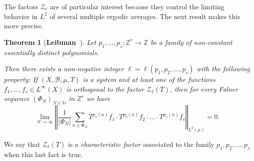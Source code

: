 \documentclass[11pt]{amsart}
\newcommand{\cB}{\mathcal{B}}
\newcommand{\cZ}{\mathcal{Z}}
\newcommand{\N}{\mathbb{N}}
\newcommand{\Z}{\mathbb{Z}}
\newcommand{\norm}[1]{\left\Vert #1\right\Vert}
\theoremstyle{plain}
\newtheorem{theorem}{Theorem}[section]
\theoremstyle{definition}
\theoremstyle{remark}
\begin{document}
The factors $\cZ_\ell$ are of particular interest because they control
the limiting behavior in $L^2$ of several multiple
ergodic averages. The next result makes this more precise.
\begin{theorem}[{\bf Leibman~\cite{L3}}]\label{T:L2}
  Let $p_1,\ldots,p_s\colon \Z^r\to \Z$ be a family of non-constant essentially
  distinct polynomials.

Then   there exists a non-negative integer $\ell=\ell(p_1,p_2,\ldots,p_s)$
  with the following property: If $(X,\cB,\mu,T)$ is a system and at least
  one of the functions
  $f_1,\ldots,f_s\in L^\infty(X)$ is orthogonal to the factor $\mathcal{Z}_\ell(T)$,
   then for every F{\o}lner sequence
  $(\Phi_N)_{N\in\N}$ in $\Z^r$ we have
$$
\lim_{N\to\infty}\norm{\frac{1}{|\Phi_N|}\sum_{n\in \Phi_N}
T^{p_1(n)}f_1\cdot T^{p_2(n)}f_2\cdot\ldots\cdot T^{p_s(n)}f_s}_{L^2(\mu)}=0.
$$
\end{theorem}
We say that $\mathcal{Z}_\ell(T)$ is a {\it characteristic factor}
associated to the family $p_1,p_2,\ldots,p_s$ when this last fact is true.
\end{document}
